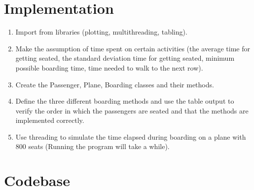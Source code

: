 \documentclass[12pt]{article}
\begin{document}
\section{Implementation}

\begin{enumerate}
    \item Import from libraries (plotting, multithreading, tabling).
    \item Make the assumption of time spent on certain activities (the average time for getting seated, the standard deviation time for getting seated, minimum possible boarding time, time needed to walk to the next row).
    \item Create the Passenger, Plane, Boarding classes and their methods.
    \item Define the three different boarding methods and use the table output to verify the order in which the passengers are seated and that the methods are implemented correctly.
    \item Use threading to simulate the time elapsed during boarding on a plane with 800 seats (Running the program will take a while).
\end{enumerate}




\newpage

\section{Codebase}
\end{document}
